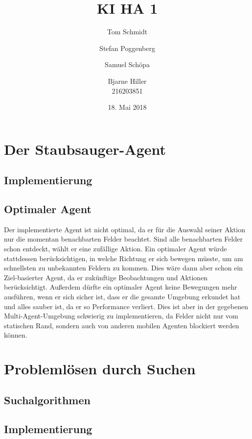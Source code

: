 \documentclass[fleqn]{scrartcl}
\author{Tom Schmidt\\ \and Stefan Poggenberg\\ \and Samuel Schöpa\\ \and Bjarne Hiller\\216203851}
\title{KI HA 1}
\date{18. Mai 2018}
\begin{document}
\maketitle
\section{Der Staubsauger-Agent}
\subsection{Implementierung}

\subsection{Optimaler Agent}
Der implementierte Agent ist nicht optimal, da er für die Auswahl seiner Aktion nur die momentan benachbarten Felder beachtet. Sind alle benachbarten Felder schon entdeckt, wählt er eine zufällige Aktion. Ein optimaler Agent würde stattdessen berücksichtigen, in welche Richtung er sich bewegen müsste, um am schnellsten zu unbekannten Feldern zu kommen. Dies wäre dann aber schon ein Ziel-basierter Agent, da er zukünftige Beobachtungen und Aktionen berücksichtigt. Außerdem dürfte ein optimaler Agent keine Bewegungen mehr ausführen, wenn er sich sicher ist, dass er die gesamte Umgebung erkundet hat und alles sauber ist, da er so Performance verliert. Dies ist aber in der gegebenen Multi-Agent-Umgebung schwierig zu implementieren, da Felder nicht nur vom statischen Rand, sondern auch von anderen mobilen Agenten blockiert werden können.
\section{Problemlösen durch Suchen}
\subsection{Suchalgorithmen}
\subsection{Implementierung}




\end{document}
